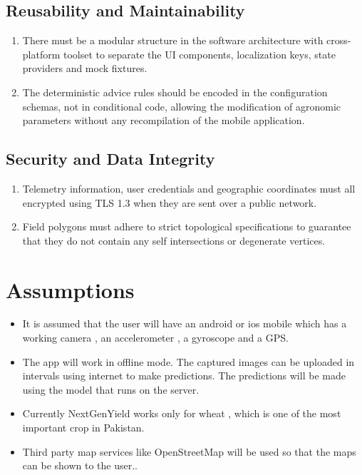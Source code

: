 \documentclass{FastFyp}
\begin{document}
\subsection{Reusability and Maintainability}

\begin{enumerate}
    \item There must be a modular structure in the software architecture with cross-platform toolset to separate the UI components, localization keys, state providers and mock fixtures.
    \item The deterministic advice rules should be encoded in the configuration schemas, not in conditional code, allowing the modification of agronomic parameters without any recompilation of the mobile application.
\end{enumerate}

\subsection{Security and Data Integrity}
\begin{enumerate}
    \item Telemetry information, user credentials and geographic coordinates must all  encrypted using TLS 1.3 when they are sent over a public network. 
    \item Field polygons must adhere to strict topological specifications to guarantee that they do not contain any self intersections or degenerate vertices.
\end{enumerate}
 

\section{Assumptions}
\begin{itemize}
    \item It is assumed that the user will have an android or ios mobile which has a working camera , an accelerometer , a gyroscope and a GPS.
    \item The app will work in offline mode. The captured images can be uploaded in intervals using internet to make predictions. The predictions will be made using the model that runs on the server.
    \item Currently NextGenYield works only for wheat , which is one of the most important crop in Pakistan.
    \item Third party map services like OpenStreetMap will be used so that the maps can be shown to the user..

\end{itemize}
\end{document}
